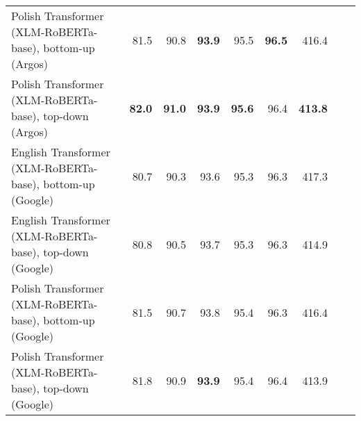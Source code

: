 \begin{table}[ht!]
{\begin{tabular}{lrrrrrrrr}
  Polish Transformer (XLM-RoBERTa-base), bottom-up (Argos) & 81.5 & 90.8 & \textbf{93.9} & 95.5 & \textbf{96.5} & 416.4 \\ 
  Polish Transformer (XLM-RoBERTa-base), top-down (Argos) & \textbf{82.0} & \textbf{91.0} & \textbf{93.9} & \textbf{95.6} & 96.4 & \textbf{413.8} \\ 
  English Transformer (XLM-RoBERTa-base), bottom-up (Google) & 80.7 & 90.3 & 93.6 & 95.3 & 96.3 & 417.3 \\ 
  English Transformer (XLM-RoBERTa-base), top-down (Google) & 80.8 & 90.5 & 93.7 & 95.3 & 96.3 & 414.9 \\ 
  Polish Transformer (XLM-RoBERTa-base), bottom-up (Google) & 81.5 & 90.7 & 93.8 & 95.4 & 96.3 & 416.4 \\ 
  Polish Transformer (XLM-RoBERTa-base), top-down (Google) & 81.8 & 90.9 & \textbf{93.9} & 95.4 & 96.4 & 413.9 \\ 
   \hline
\end{tabular}
}
\end{table}




